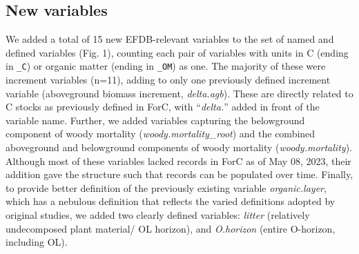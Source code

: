 \documentclass[, manuscript]{copernicus}
\begin{document}
\subsection{New variables}

We added a total of 15 new EFDB-relevant variables to the set of named
and defined variables (Fig. 1), counting each pair of variables with
units in C (ending in \texttt{\_C}) or organic matter (ending in
\texttt{\_OM}) as one. The majority of these were increment variables
(n=11), adding to only one previously defined increment variable
(aboveground biomass increment, \emph{delta.agb}). These are directly
related to C stocks as previously defined in ForC, with
``\emph{delta.}'' added in front of the variable name. Further, we added
variables capturing the belowground component of woody mortality
(\emph{woody.mortality\_root}) and the combined aboveground and
belowground components of woody mortality (\emph{woody.mortality}).
Although most of these variables lacked records in ForC as of May 08,
2023, their addition gave the structure such that records can be
populated over time. Finally, to provide better definition of the
previously existing variable \emph{organic.layer}, which has a nebulous
definition that reflects the varied definitions adopted by original
studies, we added two clearly defined variables: \emph{litter}
(relatively undecomposed plant material/ OL horizon), and
\emph{O.horizon} (entire O-horizon, including OL).
\end{document}
